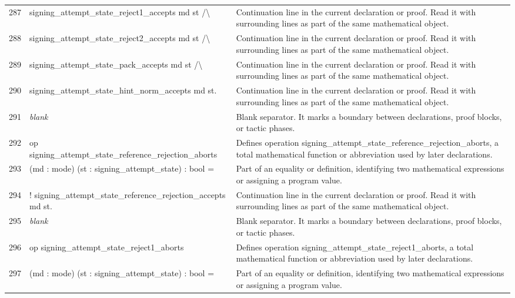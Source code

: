 \documentclass[10pt]{article}
\begin{document}
\begin{longtable}{r L{0.53\textwidth} L{0.37\textwidth}}
287 & {\ttfamily\scriptsize   signing\_attempt\_state\_reject1\_accepts md st /\textbackslash{}} & Continuation line in the current declaration or proof.  Read it with surrounding lines as part of the same mathematical object. \\
288 & {\ttfamily\scriptsize   signing\_attempt\_state\_reject2\_accepts md st /\textbackslash{}} & Continuation line in the current declaration or proof.  Read it with surrounding lines as part of the same mathematical object. \\
289 & {\ttfamily\scriptsize   signing\_attempt\_state\_pack\_accepts md st /\textbackslash{}} & Continuation line in the current declaration or proof.  Read it with surrounding lines as part of the same mathematical object. \\
290 & {\ttfamily\scriptsize   signing\_attempt\_state\_hint\_norm\_accepts md st.} & Continuation line in the current declaration or proof.  Read it with surrounding lines as part of the same mathematical object. \\
291 & {\ttfamily\scriptsize \emph{blank}} & Blank separator.  It marks a boundary between declarations, proof blocks, or tactic phases. \\
292 & {\ttfamily\scriptsize op signing\_attempt\_state\_reference\_rejection\_aborts} & Defines operation signing\_attempt\_state\_reference\_rejection\_aborts, a total mathematical function or abbreviation used by later declarations. \\
293 & {\ttfamily\scriptsize    (md : mode) (st : signing\_attempt\_state) : bool =} & Part of an equality or definition, identifying two mathematical expressions or assigning a program value. \\
294 & {\ttfamily\scriptsize   ! signing\_attempt\_state\_reference\_rejection\_accepts md st.} & Continuation line in the current declaration or proof.  Read it with surrounding lines as part of the same mathematical object. \\
295 & {\ttfamily\scriptsize \emph{blank}} & Blank separator.  It marks a boundary between declarations, proof blocks, or tactic phases. \\
296 & {\ttfamily\scriptsize op signing\_attempt\_state\_reject1\_aborts} & Defines operation signing\_attempt\_state\_reject1\_aborts, a total mathematical function or abbreviation used by later declarations. \\
297 & {\ttfamily\scriptsize    (md : mode) (st : signing\_attempt\_state) : bool =} & Part of an equality or definition, identifying two mathematical expressions or assigning a program value. \\

\end{longtable}
\end{document}
